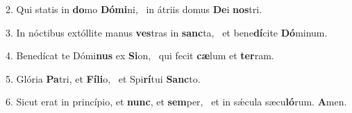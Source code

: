 2. Qui statis in \textbf{do}mo \textbf{Dó}\textbf{mi}ni, \ast\  in átriis domus \textbf{De}i \textbf{nos}tri.\

3. In nóctibus extóllite manus \textbf{ves}tras in \textbf{sanc}ta, \ast\  et bene\textbf{dí}cite \textbf{Dó}minum.\

4. Benedícat te Dómi\textbf{nus} ex \textbf{Si}on, \ast\  qui fecit \textbf{cæ}lum et \textbf{ter}ram.\

5. Glória \textbf{Pa}tri, et \textbf{Fí}\textbf{li}o, \ast\  et Spi\textbf{rí}tui \textbf{Sanc}to.\

6. Sicut erat in princípio, et \textbf{nunc}, et \textbf{sem}per, \ast\  et in sǽcula sæcu\textbf{ló}rum. \textbf{A}men.\

